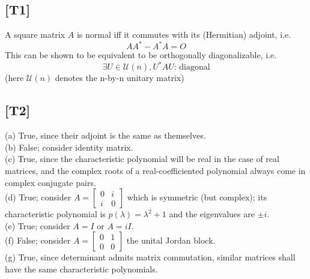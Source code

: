 \documentclass[12pt,a4paper]{article}
\renewcommand{\l}{\left}\renewcommand{\r}{\right}
\newcommand{\ttm}[4]{\l[\begin{array}{cc}{#1}&{#2}\\{#3}&{#4}\end{array}\r]} %
\begin{document}
\subsection*{[T1]} 
A square matrix $A$ is normal iff it commutes with its (Hermitian) adjoint, i.e. 
$$AA^\ast - A^\ast A = O$$
This can be shown to be equivalent to be orthogonally diagonalizable, i.e.
$$\exists U \in \mathcal U(n), U^\ast A U\text{: diagonal}$$
(here $\mathcal U(n)$ denotes the n-by-n unitary matrix)

\subsection*{[T2]}
(a) True, since their adjoint is the same as themselves. \\
(b) False; consider identity matrix.\\
(c) True, since the characteristic polynomial will be real in the case of real matrices, and the complex roots of a real-coefficiented polynomial always come in complex conjugate pairs.\\
(d) True; consider $A = \ttm 0ii0$ which is symmetric (but complex); its characteristic polynomial is $p(\lambda) = \lambda^2 + 1$ and the eigenvalues are $\pm i$. \\
(e) True; consider $A = I$ or $A = iI$. \\
(f) False; consider $A = \ttm0100$ the unital Jordan block.\\
(g) True, since determinant admits matrix commutation, similar matrices shall have the same characteristic polynomials. 
\end{document}
